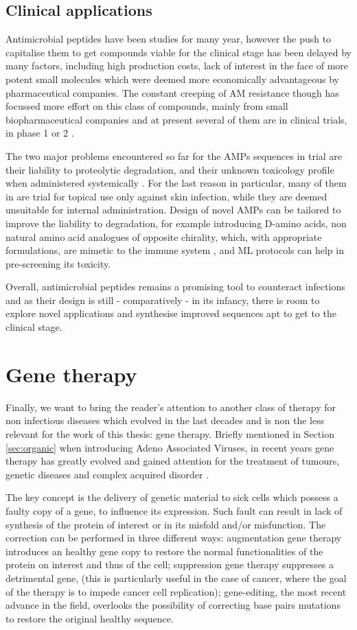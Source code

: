 \subsection{Clinical applications}
Antimicrobial peptides have been studies for many year, however the push to capitalise them to get compounds viable for the clinical stage has been delayed by many factors, including high production costs, lack of interest in the face of more potent small molecules which were deemed more economically advantageous by pharmaceutical companies.
%
The constant creeping of AM resistance though has focussed more effort on this class of compounds, mainly from small biopharmaceutical companies and at present several of them are in clinical trials, in phase 1 or 2 \cite{Naafs2018}.

The two major problems encountered so far for the AMPs sequences in trial are their liability to proteolytic degradation, and their unknown toxicology profile when administered systemically \cite{Hancock2006}. For the last reason in particular, many of them in are trial for topical use only against skin infection, while they are deemed unsuitable for internal administration.
%
Design of novel AMPs can be tailored to improve the liability to degradation, for example introducing D-amino acids, non ­natural amino ­acid analogues of opposite chirality, which, with appropriate formulations, are mimetic to the immune system \cite{Wipf2009,Choudhary2011}, and ML protocols can help in pre-screening its toxicity. 

Overall, antimicrobial peptides remains a promising tool to counteract infections and as their design is still - comparatively - in its infancy, there is room to explore novel applications and synthesise improved sequences apt to get to the clinical stage.


\section{Gene therapy}
Finally, we want to bring the reader's attention to another class of therapy for non infectious diseases which evolved in the last decades and is non the less relevant for the work of this thesis: gene therapy. Briefly mentioned in Section \ref{sec:organic} when introducing Adeno Associated Viruses, in recent years gene therapy has greatly evolved and gained attention for the treatment of tumours, genetic diseases and complex acquired disorder \cite{Anguela2019}.

The key concept is the delivery of genetic material to sick cells which possess a faulty copy of a gene, to influence its expression. Such fault can result in lack of synthesis of the protein of interest or in its misfold and/or misfunction. The correction can be performed in three different ways: augmentation gene therapy introduces an healthy gene copy to restore the normal functionalities of the protein on interest and thus of the cell; suppression gene therapy suppresses a detrimental gene, (this is particularly useful in the case of cancer, where the goal of the therapy is to impede cancer cell replication); gene-editing, the most recent advance in the field, overlooks the possibility of correcting base pairs mutations to restore the original healthy sequence.

